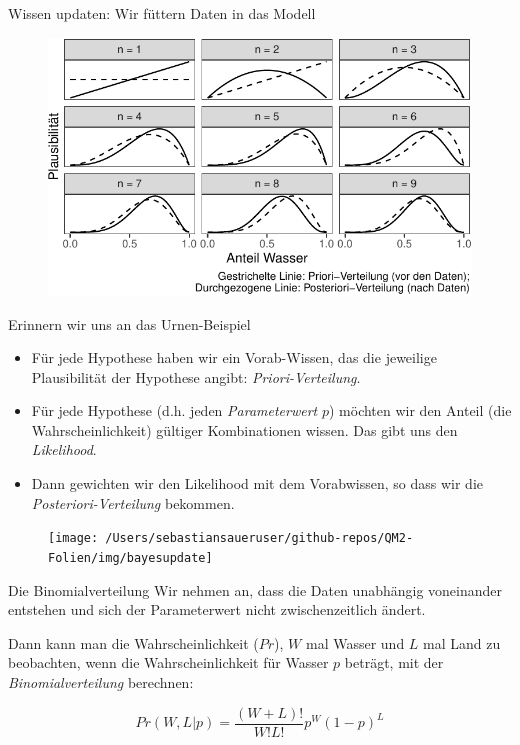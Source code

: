 \documentclass[
  ngerman,
  ignorenonframetext,
]{beamer}
\begin{document}
\begin{frame}{Wissen updaten: Wir füttern Daten in das Modell}
\protect\hypertarget{wissen-updaten-wir-fuxfcttern-daten-in-das-modell}{}
\begin{figure}[H]
\includegraphics[width=1\linewidth]{unnamed-chunk-18-1} \end{figure}
\end{frame}

\begin{frame}{Erinnern wir uns an das Urnen-Beispiel}
\protect\hypertarget{erinnern-wir-uns-an-das-urnen-beispiel}{}
\begin{itemize}
\item
  Für jede Hypothese haben wir ein Vorab-Wissen, das die jeweilige
  Plausibilität der Hypothese angibt: \emph{Priori-Verteilung}.
\item
  Für jede Hypothese (d.h. jeden \emph{Parameterwert} \(p\)) möchten wir
  den Anteil (die Wahrscheinlichkeit) gültiger Kombinationen wissen. Das
  gibt uns den \emph{Likelihood}.
\item
  Dann gewichten wir den Likelihood mit dem Vorabwissen, so dass wir die
  \emph{Posteriori-Verteilung} bekommen.
\end{itemize}

\begin{figure}[H]
\texttt{[image: /Users/sebastiansaueruser/github-repos/QM2-Folien/img/bayesupdate]} \end{figure}
\end{frame}

\begin{frame}{Die Binomialverteilung}
\protect\hypertarget{die-binomialverteilung}{}
Wir nehmen an, dass die Daten unabhängig voneinander entstehen und sich
der Parameterwert nicht zwischenzeitlich ändert.

Dann kann man die Wahrscheinlichkeit (\(Pr\)), \(W\) mal Wasser und
\(L\) mal Land zu beobachten, wenn die Wahrscheinlichkeit für Wasser
\(p\) beträgt, mit der \emph{Binomialverteilung} berechnen:

\[Pr(W,L|p) = \frac{(W+L)!}{W!L!}p^W(1-p)^L\]
\end{frame}
\end{document}
